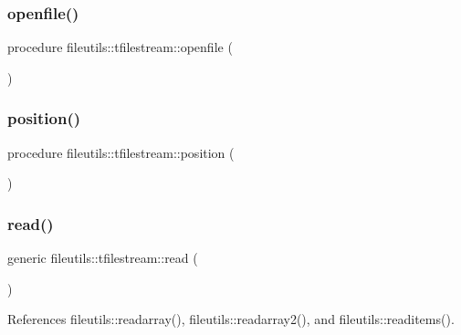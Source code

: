 \subsubsection{\texorpdfstring{openfile()}{openfile()}}
{\footnotesize\ttfamily procedure fileutils\+::tfilestream\+::openfile (\begin{DoxyParamCaption}{ }\end{DoxyParamCaption})\hspace{0.3cm}{\ttfamily [private]}}

\mbox{\label{structfileutils_1_1tfilestream_a23ec69f32d12394f941136e1275f2d96}} 
\subsubsection{\texorpdfstring{position()}{position()}}
{\footnotesize\ttfamily procedure fileutils\+::tfilestream\+::position (\begin{DoxyParamCaption}{ }\end{DoxyParamCaption})\hspace{0.3cm}{\ttfamily [private]}}

\mbox{\label{structfileutils_1_1tfilestream_a3eba218f4da08feade1f6fe889f82332}} 
\subsubsection{\texorpdfstring{read()}{read()}}
{\footnotesize\ttfamily generic fileutils\+::tfilestream\+::read (\begin{DoxyParamCaption}{ }\end{DoxyParamCaption})\hspace{0.3cm}{\ttfamily [private]}}



References fileutils\+::readarray(), fileutils\+::readarray2(), and fileutils\+::readitems().

